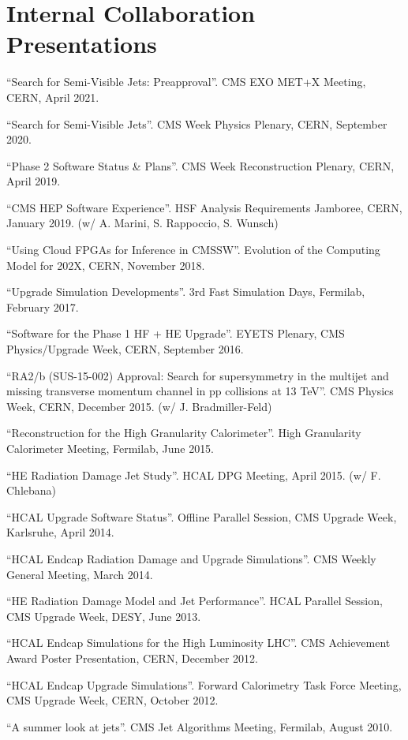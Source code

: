\section{Internal Collaboration Presentations}
\begin{description}[leftmargin=12pt,font=\normalfont,labelsep=0em]
\item ``Search for Semi-Visible Jets: Preapproval''. CMS EXO MET+X Meeting, CERN, April 2021.
\item ``Search for Semi-Visible Jets''. CMS Week Physics Plenary, CERN, September 2020.
\item ``Phase 2 Software Status \& Plans''. CMS Week Reconstruction Plenary, CERN, April 2019.
\item ``CMS HEP Software Experience''. HSF Analysis Requirements Jamboree, CERN, January 2019. (w/ A. Marini, S. Rappoccio, S. Wunsch)
\item ``Using Cloud FPGAs for Inference in CMSSW''. Evolution of the Computing Model for 202X, CERN, November 2018.
\item ``Upgrade Simulation Developments''. 3rd Fast Simulation Days, Fermilab, February 2017.
\item ``Software for the Phase 1 HF + HE Upgrade''. EYETS Plenary, CMS Physics/Upgrade Week, CERN, September 2016.
\item ``RA2/b (SUS-15-002) Approval: Search for supersymmetry in the multijet and missing transverse momentum channel in pp collisions at 13 TeV''. CMS Physics Week, CERN, December 2015. (w/ J. Bradmiller-Feld)
\item ``Reconstruction for the High Granularity Calorimeter''. High Granularity Calorimeter Meeting, Fermilab, June 2015.
\item ``HE Radiation Damage Jet Study''. HCAL DPG Meeting, April 2015. (w/ F. Chlebana)
\item ``HCAL Upgrade Software Status''. Offline Parallel Session, CMS Upgrade Week, Karlsruhe, April 2014.
\item ``HCAL Endcap Radiation Damage and Upgrade Simulations''. CMS Weekly General Meeting, March 2014.
\item ``HE Radiation Damage Model and Jet Performance''. HCAL Parallel Session, CMS Upgrade Week, DESY, June 2013.
\item ``HCAL Endcap Simulations for the High Luminosity LHC''. CMS Achievement Award Poster Presentation, CERN, December 2012.
\item ``HCAL Endcap Upgrade Simulations''. Forward Calorimetry Task Force Meeting, CMS Upgrade Week, CERN, October 2012.
\item ``A summer look at jets''. CMS Jet Algorithms Meeting, Fermilab, August 2010.
\end{description}
\fi